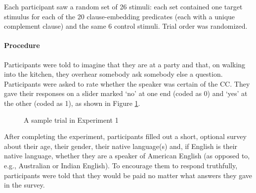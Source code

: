 \documentclass[11pt,fleqn]{article}
\newcommand{\6}{\mbox{$[\hspace*{-.6mm}[$}}
\newcommand{\9}{\mbox{$]\hspace*{-.6mm}]$}}
\begin{document}
Each participant saw a random set of 26 stimuli: each set contained one target stimulus for each of the 20 clause-embedding predicates (each with a unique complement clause) and the same 6 control stimuli. Trial order was randomized.

\paragraph{Procedure} Participants were told to imagine that they are at a party and that, on walking into the kitchen, they overhear somebody ask somebody else a question. Participants were asked to rate whether the speaker was certain of the CC. They gave their responses on a slider marked `no' at one end (coded as 0) and `yes' at the other (coded as 1), as shown in Figure \ref{fig-trial-exp1}.

\begin{figure}[h!]
\begin{center}
\end{center}
\caption{A sample trial in Experiment 1}\label{fig-trial-exp1}
\end{figure}

After completing the experiment, participants filled out a short, optional survey about their age, their gender, their native language(s) and, if English is their native language, whether they are a speaker of American English (as opposed to, e.g., Australian or Indian English). To encourage them to respond truthfully, participants were told that they would be paid no matter what answers they gave in the survey.
\end{document}
